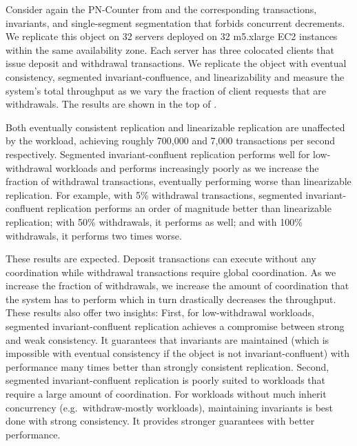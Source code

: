 \begin{benchmark}
Consider again the PN-Counter from  and the
corresponding transactions, invariants, and single-segment segmentation that
forbids concurrent decrements. We replicate this object on 32 servers
deployed on 32 m5.xlarge EC2 instances within the same availability zone.  Each
server has three colocated clients that issue deposit and withdrawal
transactions. We replicate the object with eventual consistency, segmented
invariant-confluence, and linearizability and measure the system's total
throughput as we vary the fraction of client requests that are withdrawals. The
results are shown in the top of .

Both eventually consistent replication and linearizable replication are
unaffected by the workload, achieving roughly 700,000 and 7,000 transactions
per second respectively.
%
%
Segmented invariant-confluent replication performs well for low-withdrawal
workloads and performs increasingly poorly as we increase the fraction of
withdrawal transactions, eventually performing worse than linearizable
replication. For example, with 5\% withdrawal transactions, segmented
invariant-confluent replication performs an order of magnitude better than
linearizable replication; with 50\% withdrawals, it performs as well; and with
100\% withdrawals, it performs two times worse.

These results are expected. Deposit transactions can execute without any
coordination while withdrawal transactions require global coordination. As we
increase the fraction of withdrawals, we increase the amount of coordination
that the system has to perform which in turn drastically decreases the
throughput. These results also offer two insights:
%
First, for low-withdrawal workloads, segmented invariant-confluent replication
achieves a compromise between strong and weak consistency. It guarantees that
invariants are maintained (which is impossible with eventual consistency if the
object is not invariant-confluent) with performance many times better than
strongly consistent replication.
%
Second, segmented invariant-confluent replication is poorly suited to workloads
that require a large amount of coordination. For workloads without much inherit
concurrency (e.g.\ withdraw-mostly workloads), maintaining invariants is best
done with strong consistency. It provides stronger guarantees with better
performance.
\end{benchmark}

